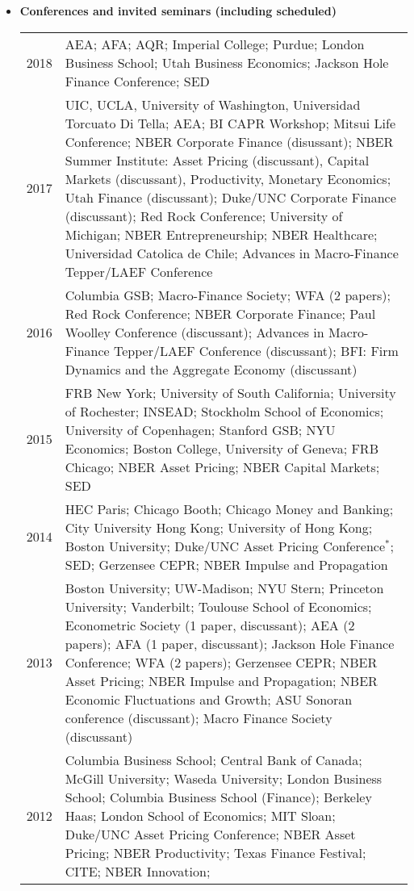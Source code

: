 \documentclass[11pt,letterpaper,serif,overlapped]{res}
\begin{document}
\begin{resume}
\begin{itemize}
\item \textbf{Conferences and invited seminars (including scheduled)}
\begin{longtable}{lp{15cm}}
2018 & AEA; AFA; AQR;  Imperial College; Purdue; London Business School; Utah Business Economics; Jackson Hole Finance Conference; SED\\
2017 & UIC, UCLA, University of Washington, Universidad Torcuato Di Tella; AEA; BI CAPR Workshop; Mitsui Life Conference; NBER Corporate Finance (disussant); NBER Summer Institute:  Asset Pricing (discussant), Capital Markets (discussant),  Productivity, Monetary Economics; Utah Finance (discussant); Duke/UNC Corporate Finance (discussant); Red Rock Conference;  University of Michigan; NBER Entrepreneurship; NBER Healthcare; Universidad Catolica de Chile; Advances in Macro-Finance Tepper/LAEF Conference \\[0.1cm]
2016 & Columbia GSB;  Macro-Finance Society; WFA (2 papers); Red Rock Conference; NBER Corporate Finance; Paul Woolley Conference (discussant); Advances in Macro-Finance Tepper/LAEF Conference (discussant); BFI: Firm Dynamics and the Aggregate Economy (discussant)\\[0.1cm]
2015 & FRB New York; University of South California; University of Rochester; INSEAD; Stockholm School of Economics; University of Copenhagen; Stanford GSB; NYU Economics; Boston College, University of Geneva; FRB Chicago; NBER Asset Pricing;  NBER Capital Markets; SED\\[0.1cm]
2014 &HEC Paris; Chicago Booth; Chicago Money and Banking; City University Hong Kong; University of Hong Kong; Boston University; Duke/UNC Asset Pricing Conference$^*$; SED; Gerzensee CEPR; NBER Impulse and Propagation\\[0.1cm]
2013 & Boston University; UW-Madison; NYU Stern; Princeton University; Vanderbilt; Toulouse School of Economics;  Econometric Society (1 paper, discussant); AEA (2 papers); AFA (1 paper, discussant); Jackson Hole Finance Conference; WFA (2 papers); Gerzensee CEPR; NBER Asset Pricing; NBER Impulse and Propagation;  NBER Economic Fluctuations and Growth; ASU Sonoran conference (discussant); Macro Finance Society (discussant) \\[0.1cm]
2012 & Columbia Business School; Central Bank of Canada; McGill University; Waseda University; London Business School; Columbia Business School (Finance); Berkeley Haas;  London School of Economics; MIT Sloan; Duke/UNC Asset Pricing Conference; NBER Asset Pricing; NBER Productivity; Texas Finance Festival; CITE; NBER Innovation;\\[0.1cm]

\end{longtable}
\end{itemize}
\end{resume}
\end{document}
